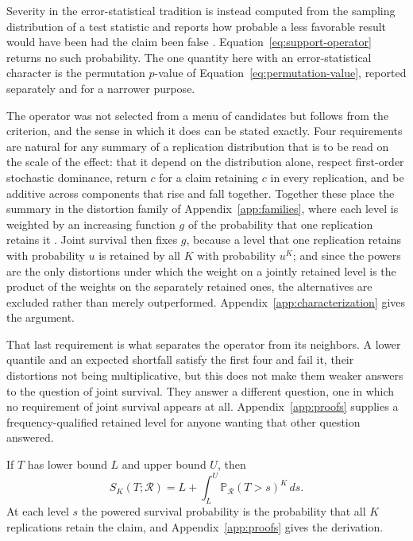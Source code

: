 \documentclass[11pt]{article}
\newcommand{\Regime}{\mathcal{R}}
\newcommand{\Prb}{\mathbb{P}}
\theoremstyle{remark}
\begin{document}
Severity in the error-statistical tradition is instead computed from the sampling distribution of a test statistic and reports how probable a less favorable result would have been had the claim been false \cite{mayo1996error}. Equation~\eqref{eq:support-operator} returns no such probability. The one quantity here with an error-statistical character is the permutation $p$-value of Equation~\eqref{eq:permutation-value}, reported separately and for a narrower purpose.

The operator was not selected from a menu of candidates but follows from the criterion, and the sense in which it does can be stated exactly. Four requirements are natural for any summary of a replication distribution that is to be read on the scale of the effect: that it depend on the distribution alone, respect first-order stochastic dominance, return $c$ for a claim retaining $c$ in every replication, and be additive across components that rise and fall together. Together these place the summary in the distortion family of Appendix~\ref{app:families}, where each level is weighted by an increasing function $g$ of the probability that one replication retains it \cite{schmeidler1986integral,yaari1987dual}. Joint survival then fixes $g$, because a level that one replication retains with probability $u$ is retained by all $K$ with probability $u^K$; and since the powers are the only distortions under which the weight on a jointly retained level is the product of the weights on the separately retained ones, the alternatives are excluded rather than merely outperformed. Appendix~\ref{app:characterization} gives the argument.

That last requirement is what separates the operator from its neighbors. A lower quantile and an expected shortfall satisfy the first four and fail it, their distortions not being multiplicative, but this does not make them weaker answers to the question of joint survival. They answer a different question, one in which no requirement of joint survival appears at all. Appendix~\ref{app:proofs} supplies a frequency-qualified retained level for anyone wanting that other question answered.

If $T$ has lower bound $L$ and upper bound $U$, then
\begin{equation}
S_K(T;\Regime)
=
L+\int_L^U
\Prb_{\Regime}(T>s)^K\,ds.
\label{eq:support-survival}
\end{equation}
At each level $s$ the powered survival probability is the probability that all $K$ replications retain the claim, and Appendix~\ref{app:proofs} gives the derivation.
\end{document}
